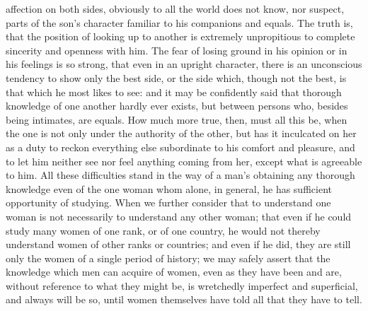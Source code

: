 \documentclass[12pt]{report}
\begin{document}
affection on both sides, obviously to all the world does not know, nor suspect, parts of the son's character familiar to his companions and equals. The truth is, that the position of looking up to another is extremely unpropitious to complete sincerity and openness with him. The fear of losing ground in his opinion or in his feelings is so strong, that even in an upright character, there is an unconscious tendency to show only the best side, or the side which, though not the best, is that which he most likes to see: and it may be confidently said that thorough knowledge of one another hardly ever exists, but between persons who, besides being intimates, are equals. How much more true, then, must all this be, when the one is not only under the authority of the other, but has it inculcated on her as a duty to reckon everything else subordinate to his comfort and pleasure, and to let him neither see nor feel anything coming from her, except what is agreeable to him. All these difficulties stand in the way of a man's obtaining any thorough knowledge even of the one woman whom alone, in general, he has sufficient opportunity of studying. When we further consider that to understand one woman is not necessarily to understand any other woman; that even if he could study many women of one rank, or of one country, he would not thereby understand women of other ranks or countries; and even if he did, they are still only the women of a single period of history; we may safely assert that the knowledge which men can acquire of women, even as they have been and are, without reference to what they might be, is wretchedly imperfect and superficial, and always will be so, until women themselves have told all that they have to tell.
\end{document}
